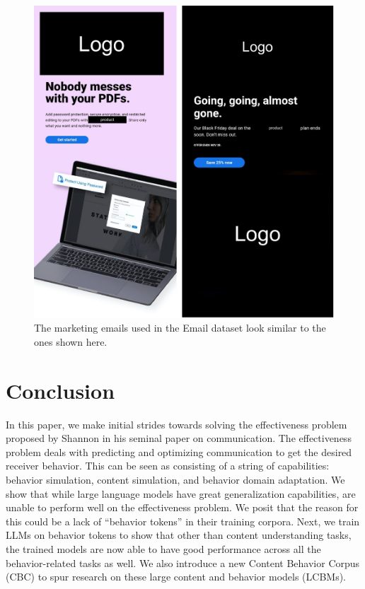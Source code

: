 \begin{figure}[!htbp]
    \centering
    \includegraphics[width=\textwidth]{images/email-ex-logo-redacted.pdf}
    \caption{The \companyName marketing emails used in the Email dataset look similar to the ones shown here.}
    \label{fig:figure-email-example-expanded}
\end{figure}




\section{Conclusion}
In this paper, we make initial strides towards solving the effectiveness problem proposed by Shannon in his seminal paper on communication. The effectiveness problem deals with predicting and optimizing communication to get the desired receiver behavior. This can be seen as consisting of a string of capabilities: behavior simulation, content simulation, and behavior domain adaptation. We show that while large language models have great generalization capabilities, are unable to perform well on the effectiveness problem. We posit that the reason for this could be a lack of ``behavior tokens'' in their training corpora. Next, we train LLMs on behavior tokens to show that other than content understanding tasks, the trained models are now able to have good performance across all the behavior-related tasks as well. We also introduce a new Content Behavior Corpus (CBC) to spur research on these large content and behavior models (LCBMs).






